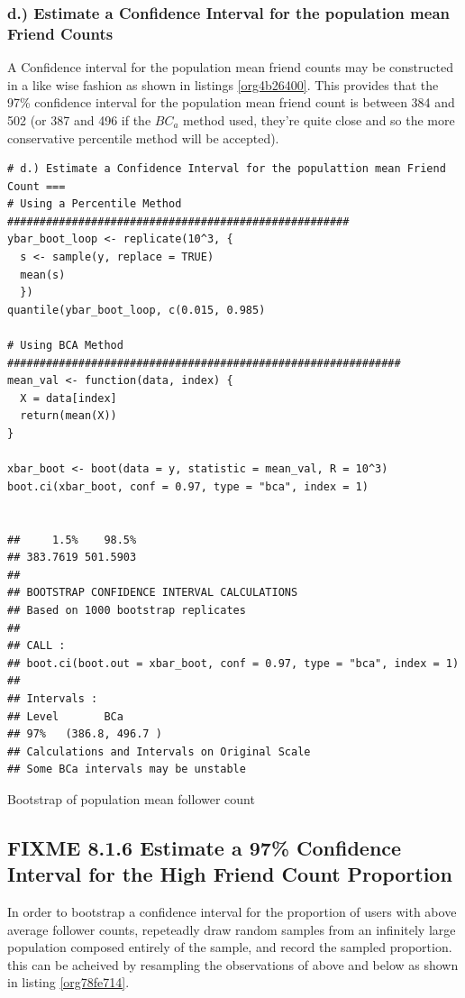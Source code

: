 \documentclass[11pt]{article}
\begin{document}
\subsubsection{d.) Estimate a Confidence Interval for the population mean Friend Counts}
\label{sec:org79c9a1e}
A Confidence interval for the population mean friend counts may be constructed in a like wise fashion as shown in listings \ref{org4b26400}. This provides that the 97\% confidence interval for the population mean friend count is between 384 and 502 (or 387 and 496 if the \(BC_{a}\) method used, they're quite close and so the more conservative percentile method will be accepted).

\begin{listing}[htbp]
\begin{verbatim}
# d.) Estimate a Confidence Interval for the populattion mean Friend Count ===
# Using a Percentile Method #####################################################
ybar_boot_loop <- replicate(10^3, {
  s <- sample(y, replace = TRUE)
  mean(s)
  })
quantile(ybar_boot_loop, c(0.015, 0.985)

# Using BCA Method #############################################################
mean_val <- function(data, index) {
  X = data[index]
  return(mean(X))
}

xbar_boot <- boot(data = y, statistic = mean_val, R = 10^3)
boot.ci(xbar_boot, conf = 0.97, type = "bca", index = 1)


##     1.5%    98.5%
## 383.7619 501.5903
##
## BOOTSTRAP CONFIDENCE INTERVAL CALCULATIONS
## Based on 1000 bootstrap replicates
##
## CALL :
## boot.ci(boot.out = xbar_boot, conf = 0.97, type = "bca", index = 1)
##
## Intervals :
## Level       BCa
## 97%   (386.8, 496.7 )
## Calculations and Intervals on Original Scale
## Some BCa intervals may be unstable
\end{verbatim}
\caption{\label{org4b26400}Bootstrap of population mean follower count}
\end{listing}

\subsection{{\bfseries\sffamily FIXME} 8.1.6 Estimate a 97\% Confidence Interval for the High Friend Count Proportion}
\label{sec:orge9d666d}
In order to bootstrap a confidence interval for the proportion of users with
above average follower counts, repeteadly draw random samples from an infinitely
large population composed entirely of the sample, and record the sampled
proportion. this can be acheived by resampling the observations of above and
below as shown in listing \ref{org78fe714}.
\end{document}
